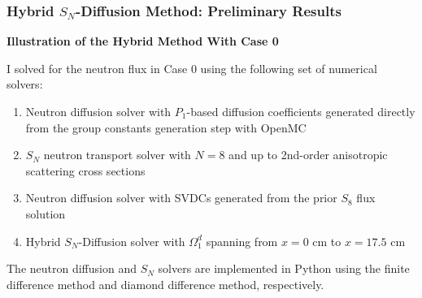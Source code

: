 \begin{frame}
  \frametitle{Hybrid $S_N$-Diffusion Method: Preliminary Results}
  \textbf{Illustration of the Hybrid Method With Case 0}
  \vspace{.3cm}

  I solved for the neutron flux in Case 0 using the following set of numerical solvers:
  \begin{enumerate}
    \item Neutron diffusion solver with $P_1$-based diffusion coefficients generated directly from
      the group constants generation step with OpenMC
    \item $S_N$ neutron transport solver with $N=8$ and up to 2nd-order anisotropic scattering
      cross sections
    \item Neutron diffusion solver with SVDCs generated from the prior $S_8$ flux solution
    \item Hybrid $S_N$-Diffusion solver with $\Omega^d_1$ spanning from $x=0$ cm to $x=17.5$ cm
  \end{enumerate}

  The neutron diffusion and $S_N$ solvers are implemented in Python using the finite difference
  method and diamond difference method, respectively.
\end{frame}

